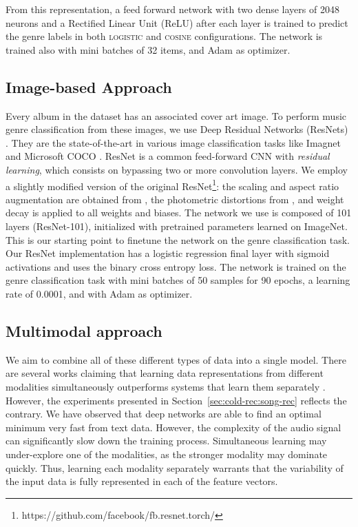 From this representation, a feed forward network with two dense layers of 2048 neurons and a Rectified Linear Unit (ReLU) after each layer is trained to predict the genre labels in both \textsc{logistic} and \textsc{cosine} configurations. 
The network is trained also with mini batches of 32 items, and Adam as optimizer.

\subsection{Image-based Approach}
\label{sec:multi-class:resnet}
Every album in the dataset has an associated cover art image. To perform music genre classification from these images, we use Deep Residual Networks (ResNets) \citep{he2016deep}.
They are the state-of-the-art in various image classification tasks like Imagnet \citep{ILSVRC15} and Microsoft COCO \citep{lin2014microsoft}. 
ResNet is a common feed-forward CNN with \emph{residual learning}, which consists on bypassing two or more convolution layers. %
We employ a slightly modified version of the original ResNet\footnote{https://github.com/facebook/fb.resnet.torch/}: the scaling and aspect ratio augmentation are obtained from \cite{szegedy2015going}, the photometric distortions from \cite{howard2013some}, and weight decay is applied to all weights and biases. %
The network we use is composed of 101 layers (ResNet-101), initialized with pretrained parameters learned on ImageNet.
This is our starting point to finetune the network on the genre classification task.
Our ResNet implementation has a logistic regression final layer with sigmoid activations and uses the binary cross entropy loss.
The network is trained on the genre classification task with mini batches of 50 samples for 90 epochs, a learning rate of 0.0001, and with Adam as optimizer.

\subsection{Multimodal approach}\label{sec:multi-class:multimodal}

We aim to combine all of these different types of data into a single model.
There are several works claiming that learning data representations from different modalities simultaneously outperforms systems that learn them separately \citep{ngiam2011multimodal,dorfer2016towards}. However, the experiments presented in Section~\ref{sec:cold-rec:song-rec} reflects the contrary. We have observed that deep networks are able to find an optimal minimum very fast from text data. However, the complexity of the audio signal can significantly slow down the training process. Simultaneous learning may under-explore one of the modalities, as the stronger modality may dominate quickly. Thus, learning each modality separately warrants that the variability of the input data is fully represented in each of the feature vectors.

